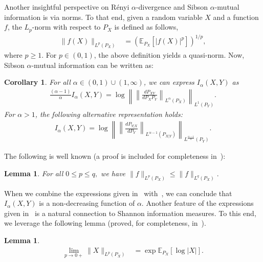 \documentclass{article}
\numberwithin{theorem}{section}
\newtheorem{lemma}[theorem]{Lemma}
\newtheorem{corollary}[theorem]{Corollary}
\numberwithin{example}{section}
\numberwithin{remark}{section}
\numberwithin{definition}{section}
\newcommand{\E}{\mathbb{E}}
\newcommand{\revised}[1]{{\color{black} #1}}
\begin{document}
Another insightful perspective on R\'enyi $\alpha$-divergence and Sibson $\alpha$-mutual information is via norms. To that end, given a random variable $X$ and a function $f$, the $L_p$-norm with respect to $P_X$ is defined as follows, 
\begin{align} \label{def:norm-distribution}
    \| f(X) \|_{L^p(P_X)} &= \left( \E_{P_X} [ |f(X)|^p ] \right)^{1/p},
\end{align}
where $p \geq 1$. For $p \in (0,1)$, the above definition yields a quasi-norm. Now, Sibson $\alpha$-mutual information can be written as:
\revised{\begin{corollary}\label{corollary:definitionvianorms}
    For all $\alpha \in (0,1) \cup (1,\infty)$, we can express $I_\alpha(X,Y)$ as
    \begin{align}
         \frac{(\alpha-1) }{\alpha}I_\alpha(X,Y)  = \log \left\|    \left\|   \frac{dP_{XY}}{dP_XP_{Y}}  \right\|_{L^{\alpha}\left(P_X\right)}\right\|_{L^1(P_Y)}.  \label{eq:normRepresentationEveryAlpha}
         \end{align}
    For $\alpha >1$, the following alternative representation holds:
    \begin{align}
         I_\alpha(X,Y) = \log \left\|    \left\|   \frac{dP_{Y|X}}{dP_{Y}}  \right\|_{L^{\alpha-1}\left(P_{X|Y}\right)}  \right\|_{L^{\frac{\alpha-1}{\alpha}}(P_Y)}.\label{eq:normRepresentationAlphaLargerThanOne}
    \end{align}
\end{corollary}}
The following is well known (a proof is included for completeness in~):

\begin{lemma}\label{lem:pnorm-nondecreasing}
For all $0 \le p\le q,$ we have
    $\| f \|_{L^p({P_X})} \le \| f \|_{L^q({P_X})}.$
\end{lemma}

When we combine the expressions given in~ with~, we can conclude that $I_\alpha(X,Y)$ is a non-decreasing function of $\alpha.$
Another feature of the expressions given in~ is a natural connection to Shannon information measures.
To this end, we leverage the following lemma (proved, for completeness, in~).

\begin{lemma}\label{lem:l0norm}
    \begin{align}
    \lim_{p \rightarrow 0+} \| X \|_{L^p(P_X)} &= \exp \E_{P_X} \left[ \log |X| \right].
    \end{align}
\end{lemma}
\end{document}
